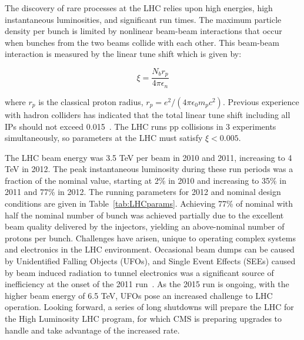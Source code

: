 The discovery of rare processes at the LHC relies upon high energies, high instantaneous luminosities, and significant run times.  The maximum particle density per bunch is limited by nonlinear beam-beam interactions that occur when bunches from the two beams collide with each other.  This beam-beam interaction is measured by the linear tune shift which is given by:



\begin{equation}
\xi = \frac{N_b r_p}{4 \pi \epsilon_n}
\label{eq:LinearTuneShift}
\end{equation}

where $r_p$ is the classical proton radius, $r_p = e^2 / (4 \pi \epsilon_0 m_p c^2)$.  Previous experience with hadron colliders has indicated that the total linear tune shift including all IPs should not exceed 0.015~\cite{LHCmachine}.  The LHC runs pp collisions in 3 experiments simultaneously, so parameters at the LHC must satisfy $\xi < 0.005$.


The LHC beam energy was 3.5 TeV per beam in 2010 and 2011, increasing to 4 TeV in 2012.  The peak instantaneous luminosity during these run periods was a fraction of the nominal value, starting at 2\% in 2010 and increasing to 35\% in 2011 and 77\% in 2012.  The running parameters for 2012 and nominal design conditions are given in Table~\ref{tab:LHCparams}.  Achieving 77\% of nominal with half the nominal number of bunch was achieved partially due to the excellent beam quality delivered by the injectors, yielding an above-nominal number of protons per bunch.  Challenges have arisen, unique to operating complex systems and electronics in the LHC environment.  Occasional beam dumps can be caused by Unidentified Falling Objects (UFOs), and Single Event Effects (SEEs) caused by beam induced radiation to tunnel electronics was a significant source of inefficiency at the onset of the 2011 run~\cite{LHCstatus}.  As the 2015 run is ongoing, with the higher beam energy of 6.5 TeV, UFOs pose an increased challenge to LHC operation.  Looking forward, a series of long shutdowns will prepare the LHC for the High Luminosity LHC program, for which CMS is preparing upgrades to handle and take advantage of the increased rate.  


